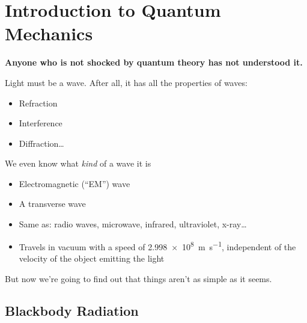 \chapter{Introduction to Quantum Mechanics}
\label{chapter:quantum}


\begin{definition}
  \textbf{Anyone who is not shocked by quantum theory has not understood it.}

  \vspace{.1in}
\end{definition}




Light must be a wave. After all, it has all the properties of waves:
\begin{itemize}
\item Refraction
\item Interference
\item Diffraction\ldots
\end{itemize}
We even know what \emph{kind} of a wave it is
\begin{itemize}
\item Electromagnetic (``EM'') wave
\item A transverse wave
\item Same as: radio waves, microwave, infrared, ultraviolet, x-ray\ldots
\item Travels in vacuum with a speed of \SI{2.998e8}{\metre\per\second},
  independent of the velocity of the object emitting the light
\end{itemize}
But now we're going to find out that things aren't as simple as it seems.
%
%
%
%
\section{Blackbody Radiation}
\begin{figure}[ht]
  \centering
\end{figure}

